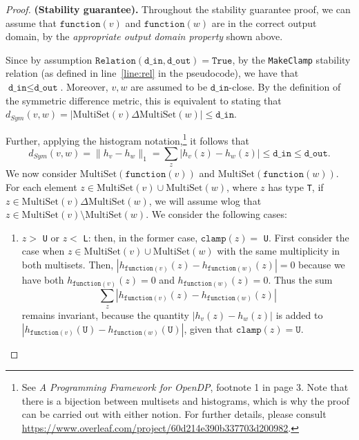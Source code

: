 \documentclass[11pt,a4paper]{article}
\theoremstyle{definition}
\newcommand{\MultiSet}{\mathrm{MultiSet}}
\newcommand{\din}{\texttt{d\_in}}
\newcommand{\dout}{\texttt{d\_out}}
\newcommand{\Relation}{\texttt{Relation}}
\newcommand{\True}{\texttt{True}}
\newcommand{\clamp}{\texttt{clamp}}
\newcommand{\function}{\texttt{function}}
\begin{document}
\begin{proof}
\smallskip
\textbf{(Stability guarantee).} Throughout the stability guarantee proof, we can assume that $\function(v)$ and $\function(w)$ are in the correct output domain, by the \textit{appropriate output domain property} shown above. 

Since by assumption $\Relation(\din, \dout) = \True$, by the \texttt{MakeClamp} stability relation (as defined in line~\ref{line:rel} in the pseudocode), we have that $\din \leq \dout$. Moreover, $v, w$ are assumed to be $\din$-close. By the definition of the symmetric difference metric, this is equivalent to stating that $d_{Sym}(v, w) = |\MultiSet(v) \Delta \MultiSet(w)| \leq \din$.

Further, applying the histogram notation,\footnote{See \textit{A Programming Framework for OpenDP}, footnote 1 in page 3. Note that there is a bijection between multisets and histograms, which is why the proof can be carried out with either notion. For further details, please consult \url{https://www.overleaf.com/project/60d214e390b337703d200982}.}  it follows that
\[
d_{Sym}(v, w) = \lVert h_{v} - h_{w}\rVert_1 = \sum_z |h_v(z) - h_w(z)| \leq \din \leq \dout.
\]
We now consider $\MultiSet(\function(v))$ and $\MultiSet(\function(w))$.
For each element $z \in \MultiSet(v) \cup \MultiSet(w)$, where $z$ has type \texttt{T}, if $z \in \MultiSet(v) \Delta \MultiSet(w)$, we will assume wlog that $z \in \MultiSet(v) \setminus \MultiSet(w)$. We consider the following cases:

\begin{enumerate}
    \item $z >$ \texttt{U} or $z <$ \texttt{L}: then, in the former case, $\clamp(z) =$ \texttt{U}. First consider the case when $z \in \MultiSet(v) \cup \MultiSet(w)$ with the same multiplicity in both multisets. Then, $|h_{\function(v)}(z) - h_{\function(w)}(z)| = 0$ because we have both $h_{\function(v)}(z) = 0$ and $h_{\function(w)}(z) = 0$. Thus the sum
    \[
    \sum_z |h_{\function(v)}(z) - h_{\function(w)}(z)|
    \]
    remains invariant, because the quantity $|h_{v}(z) - h_{w}(z)|$ is added to $|h_{\function(v)}(\texttt{U}) - h_{\function(w)}(\texttt{U})|$, given that $\clamp(z) = \texttt{U}$. 
    

\end{enumerate}
\end{proof}
\end{document}
